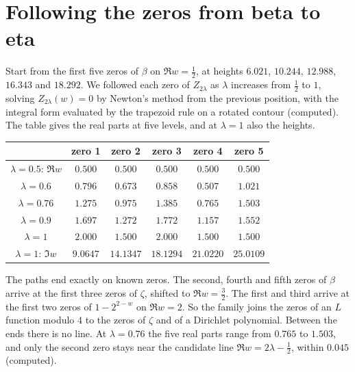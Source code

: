 \section{Following the zeros from beta to eta}\label{ml:sec:track}
Start from the first five zeros of $\beta$ on $\Re w=\frac12$, at heights $6.021$, $10.244$, $12.988$, $16.343$ and $18.292$. We followed each zero of $Z_{2\lambda}$ as $\lambda$ increases from $\frac12$ to $1$, solving $Z_{2\lambda}(w)=0$ by Newton's method from the previous position, with the integral form evaluated by the trapezoid rule on a rotated contour (computed). The table gives the real parts at five levels, and at $\lambda=1$ also the heights.
\begin{center}
\small
\begin{tabular}{cccccc}
\toprule
& zero 1 & zero 2 & zero 3 & zero 4 & zero 5\\
\midrule
$\lambda=0.5$: $\Re w$ & $0.500$ & $0.500$ & $0.500$ & $0.500$ & $0.500$\\
$\lambda=0.6$ & $0.796$ & $0.673$ & $0.858$ & $0.507$ & $1.021$\\
$\lambda=0.76$ & $1.275$ & $0.975$ & $1.385$ & $0.765$ & $1.503$\\
$\lambda=0.9$ & $1.697$ & $1.272$ & $1.772$ & $1.157$ & $1.552$\\
$\lambda=1$ & $2.000$ & $1.500$ & $2.000$ & $1.500$ & $1.500$\\
$\lambda=1$: $\Im w$ & $9.0647$ & $14.1347$ & $18.1294$ & $21.0220$ & $25.0109$\\
\bottomrule
\end{tabular}
\end{center}
The paths end exactly on known zeros. The second, fourth and fifth zeros of $\beta$ arrive at the first three zeros of $\zeta$, shifted to $\Re w=\frac32$. The first and third arrive at the first two zeros of $1-2^{2-w}$ on $\Re w=2$. So the family joins the zeros of an $L$ function modulo $4$ to the zeros of $\zeta$ and of a Dirichlet polynomial. Between the ends there is no line. At $\lambda=0.76$ the five real parts range from $0.765$ to $1.503$, and only the second zero stays near the candidate line $\Re w=2\lambda-\frac12$, within $0.045$ (computed).

